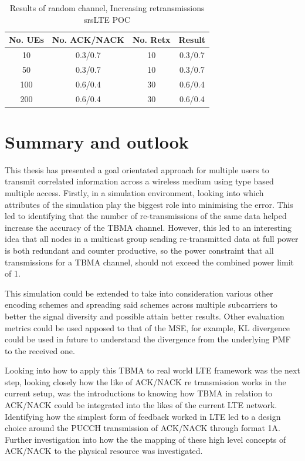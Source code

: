 \documentclass{article}
\begin{document}
\begin{table}[H]
    \centering
 \begin{tabular}{||c c c c||} 
 \hline
 No. UEs & No. ACK/NACK & No. Retx & Result \\ [0.5ex] 
 \hline\hline
 10 & 0.3/0.7 & 10 &  0.3/0.7 \\ 
 \hline
 50 & 0.3/0.7 & 10 & 0.3/0.7 \\
 \hline
 100 & 0.6/0.4 & 30 & 0.6/0.4 \\
 \hline
 200 & 0.6/0.4 & 30 & 0.6/0.4 \\ [1ex] 
 \hline
\end{tabular}
    \caption{Results of random channel, Increasing retransmissions srsLTE POC}
    \label{tab:rand_chan_rtx_increase}
\end{table}

\section{Summary and outlook}\label{summary_out}

This thesis has presented a goal orientated approach for multiple users to transmit correlated information across a wireless medium using type based multiple access. Firstly, in a simulation environment, looking into which attributes of the simulation play the biggest role into minimising the error. This led to identifying that the number of re-transmissions of the same data helped increase the accuracy of the TBMA channel. However, this led to an interesting idea that all nodes in a multicast group sending re-transmitted data at full power is both redundant and counter productive, so the power constraint that all transmissions for a TBMA channel, should not exceed the combined power limit of 1.

This simulation could be extended to take into consideration various other encoding schemes and spreading said schemes across multiple subcarriers to better the signal diversity and possible attain better results. Other evaluation metrics could be used apposed to that of the MSE, for example, KL divergence could be used in future to understand the divergence from the underlying PMF to the received one.  

Looking into how to apply this TBMA to real world LTE framework was the next step, looking closely how the like of ACK/NACK re transmission works in the current setup, was the introductions to knowing how TBMA in relation to ACK/NACK could be integrated into the likes of the current LTE network. Identifying how the simplest form of feedback worked in LTE led to a design choice around the PUCCH transmission of ACK/NACK through format 1A. Further investigation into how the the  mapping of these high level concepts of ACK/NACK to the physical resource was investigated. 
\end{document}
